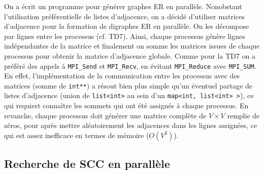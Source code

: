 \documentclass[a4paper,12pt,twoside]{article}
\begin{document}
On a écrit un programme pour générer graphes ER en parallèle. Nonobstant l’utilisation préférentielle de listes d’adjacence, on a décidé d’utiliser matrices d’adjacence pour la formation de digraphes ER en parallèle. On les décompose par lignes entre les processus (cf. TD7). Ainsi, chaque processus génère lignes indépendantes de la matrice et finalement on somme les matrices issues de chaque processus pour obtenir la matrice d’adjacence globale. Comme pour la TD7 on a préféré des appels à \texttt{MPI\_Send} et \texttt{MPI\_Recv}, en évitant \texttt{MPI\_Reduce} avec \texttt{MPI\_SUM}. En effet, l’implémentation de la communication entre les processus avec des matrices (somme de \texttt{int**}) a résout bien plus simple qu’un éventuel partage de listes d’adjacence (union de \texttt{list<int>} au sein d’un \texttt{map<int, list<int> >}), ce qui requiert connaître les sommets qui ont été assignés à chaque processus. En revanche, chaque processus doit générer une matrice complète de $V \times V$ remplie de zéros, pour après mettre aléatoirement les adjacences dans les lignes assignées, ce qui est assez inefficace en termes de mémoire ($O(V^2)$). 


\subsection{Recherche de SCC en parallèle}
\end{document}
